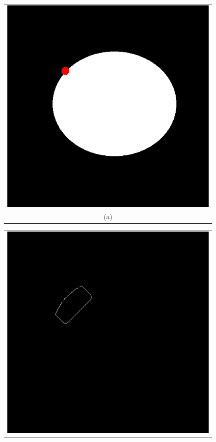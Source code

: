 \begin{figure}[h!]
\centering
\begin{minipage}{.49\textwidth}
\begin{tabular}{c}
\includegraphics[width=.9\textwidth]{results/2D/circleSeedPartlyOutside} \\
(a)
\end{tabular}
\end{minipage}
\begin{minipage}{.49\textwidth}
\begin{tabular}{c}
\includegraphics[width=.9\textwidth]{results/2D/circleSeedPartlyOutside300} \\

\end{tabular}
\end{minipage}
\end{figure}
